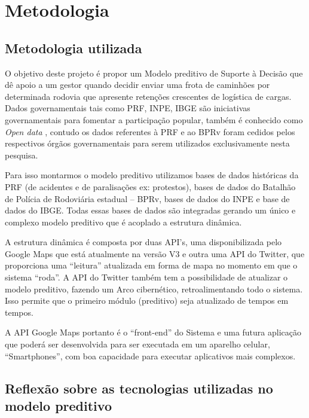 \chapter{ Metodologia}\label{meto}


\section{ Metodologia utilizada}\label{intro:metodologia}

O objetivo deste projeto é propor um Modelo preditivo de Suporte à Decisão que dê apoio a um gestor quando decidir enviar uma frota de 
caminhões por determinada rodovia que apresente retenções crescentes de logística de cargas.\\

Dados governamentais tais como PRF, INPE, IBGE são iniciativas governamentais para fomentar a participação popular, também é 
conhecido como \textit{Open data} \cite{DadosGoverno}, contudo os dados referentes à PRF e ao BPRv foram cedidos pelos respectivos 
órgãos governamentais para serem utilizados exclusivamente nesta pesquisa.

Para isso montarmos o modelo preditivo utilizamos bases de dados históricas da PRF (de acidentes e de paralisações ex: protestos), bases de dados
do Batalhão de Polícia de Rodoviária estadual -- BPRv, bases de dados do INPE e base de dados do IBGE. Todas essas bases de dados são integradas
gerando um único e complexo modelo preditivo que é acoplado a estrutura dinâmica.

A estrutura dinâmica é composta por duas API's, uma disponibilizada pelo Google Maps que está atualmente na versão V3 e outra uma API do Twitter,
que proporciona uma ``leitura'' atualizada em forma de mapa no momento em que o sistema ``roda''. 
A API do Twitter também tem a possibilidade de atualizar o modelo preditivo, fazendo um Arco cibernético, retroalimentando todo o sistema. 
Isso permite que o primeiro módulo (preditivo) seja atualizado de tempos em tempos.

A API Google Maps portanto é o ``front-end'' do Sistema e uma futura aplicação que poderá ser desenvolvida para ser executada em um aparelho 
celular, ``Smartphones'', com boa capacidade para executar aplicativos mais complexos.

\pagebreak

\section{ Reflexão sobre as tecnologias utilizadas no modelo preditivo}\label{result}

